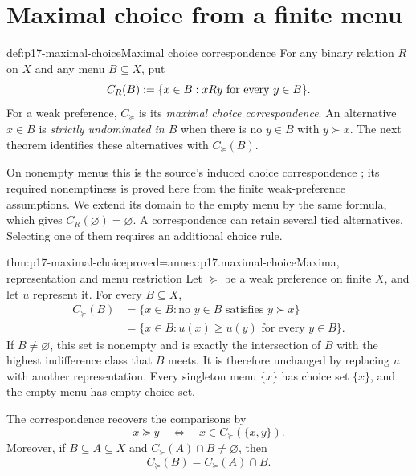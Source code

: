 \section{Maximal choice from a finite menu}
\label{sec:p17-maximal-choice}

\begin{hbdefinition}{def:p17-maximal-choice}{Maximal choice correspondence}
For any binary relation \(R\) on \(X\) and any menu \(B\subseteq X\),
put
\[
 C_R(B)\mathrel{:=}\{x\in B:xRy\text{ for every }y\in B\}.
\]
For a weak preference, \(C_{\succeq}\) is its \emph{maximal choice
correspondence}. An alternative \(x\in B\) is \emph{strictly
undominated in \(B\)} when there is no \(y\in B\) with \(y\succ x\).
The next theorem identifies these alternatives with \(C_{\succeq}(B)\).

On nonempty menus this is the source's induced choice correspondence
\cite[p.~31]{Rubinstein2015LectureNotes}; its required nonemptiness is
proved here from the finite weak-preference assumptions. We extend its
domain to the empty menu by the same formula, which gives
\(C_R(\varnothing)=\varnothing\). A correspondence can retain several
tied alternatives. Selecting one of them requires an additional choice rule.
\end{hbdefinition}

\begin{hbtheorem}{thm:p17-maximal-choice}{proved=annex:p17.maximal-choice}{Maxima, representation and menu restriction}
Let \(\succeq\) be a weak preference on finite \(X\), and let
\(u\) represent it. For every \(B\subseteq X\),
\[
\begin{aligned}
 C_{\succeq}(B)
   &=\{x\in B:\text{no }y\in B\text{ satisfies }y\succ x\}\\
   &=\{x\in B:u(x)\geq u(y)\text{ for every }y\in B\}.
\end{aligned}
\]
If \(B\ne\varnothing\), this set is nonempty and is exactly the
intersection of \(B\) with the highest indifference class that \(B\)
meets. It is therefore unchanged by replacing \(u\) with another
representation. Every singleton menu \(\{x\}\) has choice set
\(\{x\}\), and the empty menu has empty choice set.

The correspondence recovers the comparisons by
\[
 x\succeq y\quad\Longleftrightarrow\quad
       x\in C_{\succeq}(\{x,y\}).
\]
Moreover, if \(B\subseteq A\subseteq X\) and
\(C_{\succeq}(A)\cap B\ne\varnothing\), then
\[
 C_{\succeq}(B)=C_{\succeq}(A)\cap B.
\]
\end{hbtheorem}


